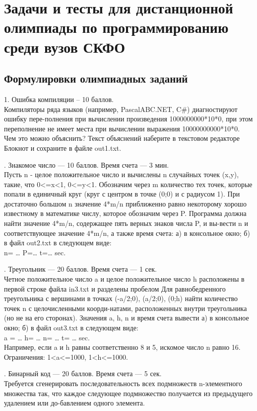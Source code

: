 \chapter{Задачи и тесты для дистанционной олимпиады по программированию среди вузов СКФО}





\section{Формулировки олимпиадных заданий}
1. Ошибка компиляции – 10 баллов.\\
Компиляторы ряда языков (например, PascalABC.NET, C\#) диагностируют ошибку пере-полнения при вычислении произведения
1000000000*10*0,
при этом переполнение не имеет места при вычислении выражения 10000000000*10*0.
\\
Чем это можно объяснить? Текст объяснений наберите в текстовом редакторе Блокнот и сохраните в файле out1.txt.
\par{}. Знакомое число --- 10 баллов. Время счета --- 3 мин.\\
Пусть n - целое положительное число и вычислены n случайных точек (x,y), такие, что 0<=x<1, 0<=y<1. Обозначим через m количество тех точек, которые попали в единичный круг (круг с центром в точке (0;0) и с радиусом 1). При достаточно большом n значение 4*m/n приближенно равно некоторому хорошо известному в математике числу, которое обозначим через P.
Программа должна найти значение 4*m/n, содержащее пять верных знаков числа P, и вы-вести n и соответствующее значение 4*m/n, а также время счета: а) в консольное окно; б) в файл out2.txt в следующем виде:\\
n= …         P=…         t=…    sec.
\par{}. Треугольник --- 20 баллов. Время счета --- 1 сек.\\
Четное положительное число a и целое положительное число h расположены в первой строке файла in3.txt и разделены пробелом Для равнобедренного треугольника с вершинами в точках (-a/2;0), (a/2;0), (0;h) найти количество точек n с целочисленными коорди-натами, расположенных внутри треугольника (но не на его сторонах). Значения a, h, n и время счета вывести а) в консольное окно; б) в файл out3.txt в следующем виде:\\
a = … h= … n= … t= … sec.\\
Например, если a и h равны соответственно 8 и 5, искомое число n равно 16.\\
Ограничения: 1<a<=1000, 1<h<=1000.
\par{}. Бинарный код --- 20 баллов. Время счета --- 5 сек.\\
Требуется сгенерировать последовательность всех подмножеств n-элементного множества так, что каждое следующее подмножество получается из предыдущего удалением или до-бавлением одного элемента.

